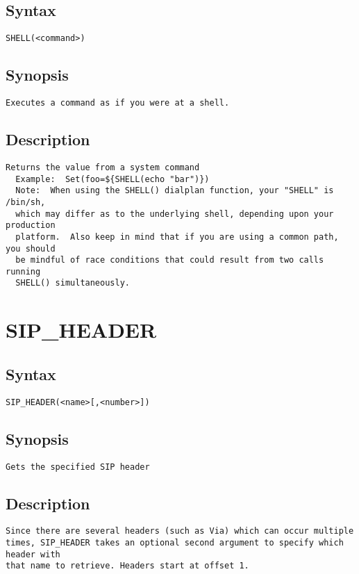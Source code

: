 \subsection{Syntax}
\begin{verbatim}
SHELL(<command>)
\end{verbatim}
\subsection{Synopsis}
\begin{verbatim}
Executes a command as if you were at a shell.
\end{verbatim}
\subsection{Description}
\begin{verbatim}
Returns the value from a system command
  Example:  Set(foo=${SHELL(echo "bar")})
  Note:  When using the SHELL() dialplan function, your "SHELL" is /bin/sh,
  which may differ as to the underlying shell, depending upon your production
  platform.  Also keep in mind that if you are using a common path, you should
  be mindful of race conditions that could result from two calls running
  SHELL() simultaneously.

\end{verbatim}


\section{SIP\_HEADER}
\subsection{Syntax}
\begin{verbatim}
SIP_HEADER(<name>[,<number>])
\end{verbatim}
\subsection{Synopsis}
\begin{verbatim}
Gets the specified SIP header
\end{verbatim}
\subsection{Description}
\begin{verbatim}
Since there are several headers (such as Via) which can occur multiple
times, SIP_HEADER takes an optional second argument to specify which header with
that name to retrieve. Headers start at offset 1.

\end{verbatim}


